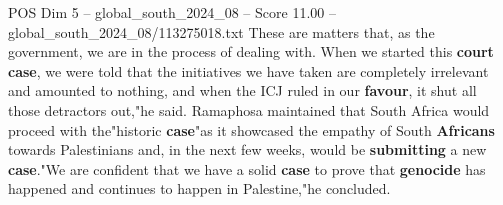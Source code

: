 \begin{textsample}{POS Dim 5 – global\_south\_2024\_08 – Score 11.00 – global\_south\_2024\_08/113275018.txt}
These are matters that, as the government, we are in the process of dealing with.
When we started this \textbf{court} \textbf{case}, we were told that the initiatives we have taken are completely irrelevant and amounted to nothing, and when the ICJ ruled in our \textbf{favour}, it shut all those detractors out,"he said.
Ramaphosa maintained that South Africa would proceed with the"historic \textbf{case}"as it showcased the empathy of South \textbf{Africans} towards Palestinians and, in the next few weeks, would be \textbf{submitting} a new \textbf{case}."We are confident that we have a solid \textbf{case} to prove that \textbf{genocide} has happened and continues to happen in Palestine,"he concluded.

\end{textsample}
